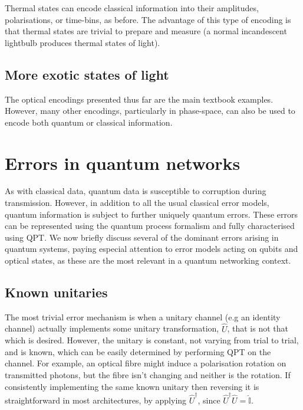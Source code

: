 \documentclass[aps,rmp,twocolumn,amsmath,amssymb,nofootinbib,superscriptaddress]{revtex4}
\begin{document}
Thermal states can encode classical information into their amplitudes, polarisations, or time-bins, as before. The advantage of this type of encoding is that thermal states are trivial to prepare and measure (a normal incandescent lightbulb produces thermal states of light).

%
%

\subsection{More exotic states of light} \label{sec:exotic}

The optical encodings presented thus far are the main textbook examples. However, many other encodings, particularly in phase-space, can also be used to encode both quantum or classical information.

%
%

\section{Errors in quantum networks} \label{sec:errors_in_nets}

As with classical data, quantum data is susceptible to corruption during transmission. However, in addition to all the usual classical error models, quantum information is subject to further uniquely quantum errors. These errors can be represented using the quantum process formalism and fully characterised using QPT. We now briefly discuss several of the dominant errors arising in quantum systems, paying especial attention to error models acting on qubits and optical states, as these are the most relevant in a quantum networking context.

%
%

\subsection{Known unitaries}

The most trivial error mechanism is when a unitary channel (e.g an identity channel) actually implements some unitary transformation, $\hat{U}$, that is not that which is desired. However, the unitary is constant, not varying from trial to trial, and is known, which can be easily determined by performing QPT on the channel. For example, an optical fibre might induce a polarisation rotation on transmitted photons, but the fibre isn't changing and neither is the rotation. If consistently implementing the same known unitary then reversing it is straightforward in most architectures, by applying $\hat{U}^\dag$, since $\hat{U}^\dag\hat{U}=\hat{\mathbb{I}}$.
\end{document}
